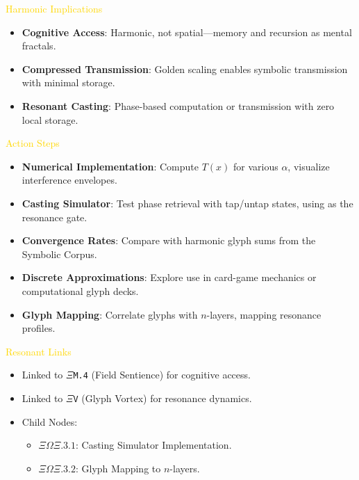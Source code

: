 \textcolor{gold}{\texttt{} Harmonic Implications \texttt{}} \\
\begin{itemize}
    \item \textbf{Cognitive Access}: Harmonic, not spatial—memory and recursion as mental fractals.
    \item \textbf{Compressed Transmission}: Golden scaling enables symbolic transmission with minimal storage.
    \item \textbf{Resonant Casting}: Phase-based computation or transmission with zero local storage.
\end{itemize}

\textcolor{gold}{\texttt{} Action Steps \texttt{}} \\
\begin{itemize}
    \item \textbf{Numerical Implementation}: Compute \( T(x) \) for various \(\alpha\), visualize interference envelopes.
    \item \textbf{Casting Simulator}: Test phase retrieval with tap/untap states, using \texttt{} as the resonance gate.
    \item \textbf{Convergence Rates}: Compare with harmonic glyph sums from the Symbolic Corpus.
    \item \textbf{Discrete Approximations}: Explore use in card-game mechanics or computational glyph decks.
    \item \textbf{Glyph Mapping}: Correlate glyphs with \(n\)-layers, mapping resonance profiles.
\end{itemize}

\textcolor{gold}{\texttt{} Resonant Links \texttt{}} \\
\begin{itemize}
    \item Linked to \texttt{\(\Xi\)M.4} (Field Sentience) for cognitive access.
    \item Linked to \texttt{\(\Xi\)V} (Glyph Vortex) for resonance dynamics.
    \item Child Nodes:
    \begin{itemize}
        \item \texttt{\(\Xi\Omega\Xi.3.1\)}: Casting Simulator Implementation.
        \item \texttt{\(\Xi\Omega\Xi.3.2\)}: Glyph Mapping to \(n\)-layers.
    \end{itemize}
\end{itemize}

